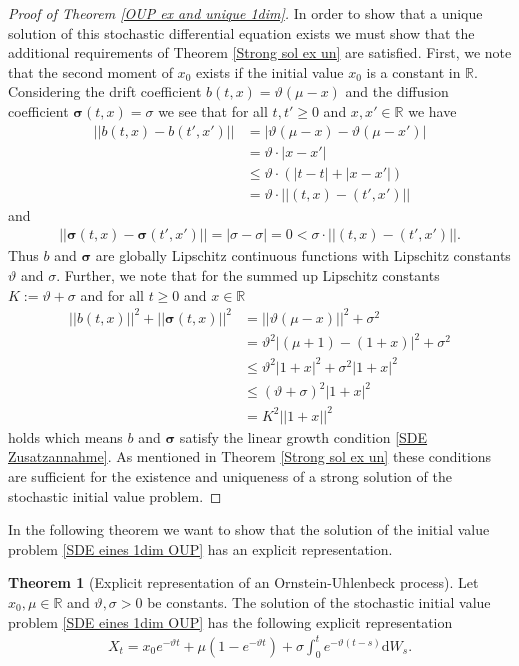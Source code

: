 \documentclass[11pt,titlepage]{article}
\newcommand{\R}{\mathbb{R}} %
\newcommand{\abs}[1]{{\left| #1 \right|}}
\theoremstyle{definition}
\newtheorem{theorem}{Theorem}[section]
\theoremstyle{remark}
\begin{document}
	\begin{proof}[Proof of Theorem \ref{OUP ex and unique 1dim}]
		In order to show that a unique solution of this stochastic differential equation exists 
		we must show that the additional requirements of Theorem \ref{Strong sol ex un} are satisfied.
		First, we note that the second moment 
		of $x_0$ exists if the initial value $x_0$ is a constant in $\R$. Considering the drift coefficient $b(t,x)= \vartheta(\mu-x)$ and the diffusion coefficient $\boldsymbol{\sigma}(t, x) = \sigma$ we see that 
		for all $t, t'\geq 0$ and $x, x'\in\R$ we have
		\begin{align*}
			\abs{\abs{b(t, x) -b(t',x')}} &= \abs{\vartheta(\mu-x) -\vartheta(\mu-x')}\\
			&= \vartheta\cdot \abs{x - x'} \\
			&\leq \vartheta \cdot(\abs{t-t} + \abs{x-x'})\\
			&= \vartheta\cdot \abs{\abs{(t, x) - (t',x')}}
		\end{align*}
		and 
		\begin{align*}
			\abs{\abs{\boldsymbol{\sigma}(t, x) -\boldsymbol{\sigma}(t',x')}} = \abs{\sigma - \sigma} = 0 < \sigma\cdot \abs{\abs{(t, x) - (t',x')}}.
		\end{align*}
		Thus $b$ and $\boldsymbol{\sigma}$ are globally Lipschitz continuous functions with 
		Lipschitz constants $\vartheta$ and $\sigma$.
		\newpage
		Further, we note that 
		for the summed up Lipschitz constants $K:=\vartheta+\sigma$ and for all $t\geq 0$ and $x\in\R$
		\begin{align*}
			\abs{\abs{b(t,x)}}^2 + \abs{\abs{\boldsymbol{\sigma}(t,x)}}^2 &= \abs{\abs{\vartheta(\mu -x)}}^2 + \sigma^2 \\
			&= \vartheta^2 \abs{(\mu + 1) - (1+x)}^2 + \sigma^2 \\
			&\leq \vartheta^2 \abs{1+x}^2 + \sigma^2 \abs{1+x}^2 \\
			&\leq (\vartheta + \sigma)^2 \abs{1+x}^2\\
			&= K^2 \abs{\abs{1+x}}^2
		\end{align*}
		holds which means $b$ and $\boldsymbol{\sigma}$ satisfy the linear growth condition \ref{SDE Zusatzannahme}. As mentioned in Theorem \ref{Strong sol ex un} these conditions are sufficient for the existence and uniqueness of a strong  
		solution of the stochastic initial value problem.
	\end{proof}

	
	
	In the following theorem we want to show that the solution of the initial value problem \ref{SDE eines 1dim OUP} has an explicit representation.
	\begin{theorem}[Explicit representation of an Ornstein-Uhlenbeck process]
		Let $x_0,\mu\in\R$ and $\vartheta,\sigma>0$ be constants. The solution of the stochastic initial value problem \ref{SDE eines 1dim OUP} has the following explicit representation
		\begin{align} \label{1dim expl repr OUP}
			X_t = x_0 e^{-\vartheta t}+\mu(1-e^{-\vartheta t})+\sigma \int_0^t e^{-\vartheta (t-s)}\mathrm{d}W_s.
		\end{align}
	\end{theorem}
	
\end{document}
